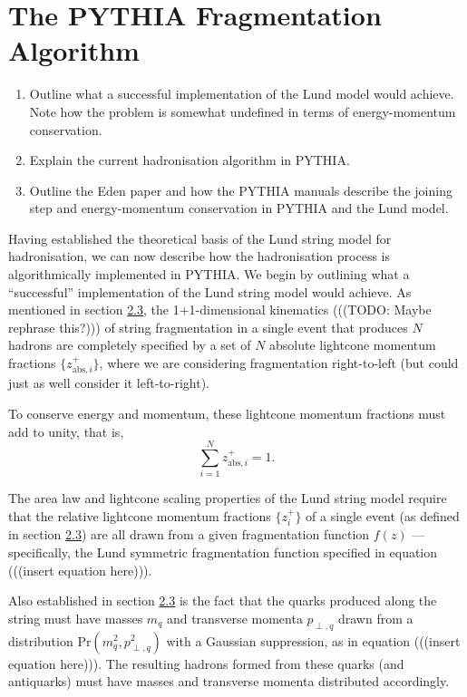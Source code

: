 \documentclass[12pt,a4paper]{report}
\begin{document}
\section{The PYTHIA Fragmentation Algorithm}
\begin{enumerate}
\item Outline what a successful implementation of the Lund model would achieve. Note how the problem is somewhat undefined in terms of energy-momentum conservation. 
\item Explain the current hadronisation algorithm in PYTHIA.
\item Outline the Eden paper and how the PYTHIA manuals describe the joining step and energy-momentum conservation in PYTHIA and the Lund model.
  
\end{enumerate}

Having established the theoretical basis of the Lund string model for hadronisation, we can now describe how the hadronisation process is algorithmically implemented in PYTHIA. We begin by outlining what a ``successful'' implementation of the Lund string model would achieve. As mentioned in section \hyperref[sec:lsm]{2.3}, the 1+1-dimensional kinematics (((TODO: Maybe rephrase this?))) of string fragmentation in a single event that produces $N$ hadrons are completely specified by a set of $N$ absolute lightcone momentum fractions $\{ z_{\text{abs},i}^+ \}$, where we are considering fragmentation right-to-left (but could just as well consider it left-to-right).

To conserve energy and momentum, these lightcone momentum fractions must add to unity, that is,
\begin{equation}
  \sum_{i=1}^N z_{\text{abs},i}^+ = 1.
\end{equation}

The area law and lightcone scaling properties of the Lund string model require that the relative lightcone momentum fractions $\{ z_i^+ \}$ of a single event (as defined in section \hyperref[sec:lsm]{2.3}) are all drawn from a given fragmentation function $f(z)$ --- specifically, the Lund symmetric fragmentation function specified in equation (((insert equation here))).

Also established in section \hyperref[sec:lsm]{2.3} is the fact that the quarks produced along the string must have masses $m_q$ and transverse momenta $p_{\perp,q}$ drawn from a distribution $\text{Pr}(m_q^2, p_{\perp,q}^2)$ with a Gaussian suppression, as in equation (((insert equation here))). The resulting hadrons formed from these quarks (and antiquarks) must have masses and transverse momenta distributed accordingly.
\end{document}
